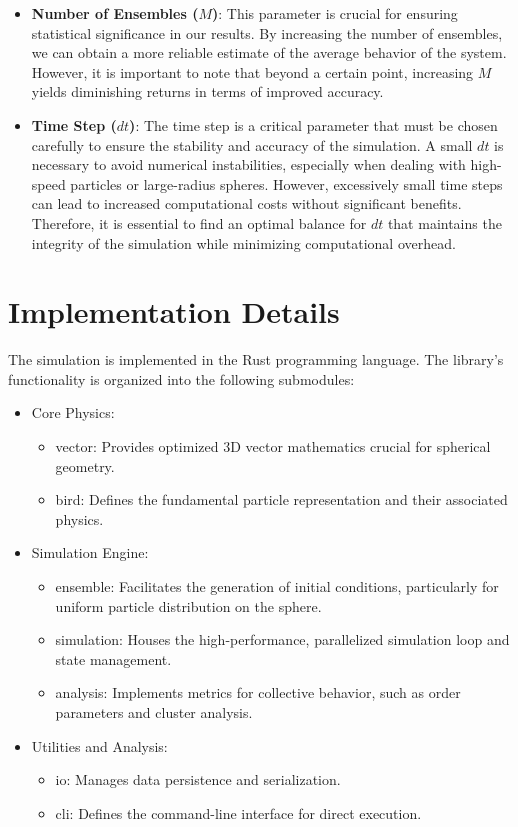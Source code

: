 \documentclass[12pt,a4paper]{article}
\begin{document}
\begin{itemize}
    \item \textbf{Number of Ensembles ($M$)}: 
    This parameter is crucial for ensuring statistical significance in our results. By increasing the number of ensembles, we can obtain a more reliable estimate of the average behavior of the system. However, it is important to note that beyond a certain point, increasing \(M\) yields diminishing returns in terms of improved accuracy.
    \item \textbf{Time Step ($dt$)}: 
    The time step is a critical parameter that must be chosen carefully to ensure the stability and accuracy of the simulation. A small \(dt\) is necessary to avoid numerical instabilities, especially when dealing with high-speed particles or large-radius spheres. However, excessively small time steps can lead to increased computational costs without significant benefits. Therefore, it is essential to find an optimal balance for \(dt\) that maintains the integrity of the simulation while minimizing computational overhead.
\end{itemize}

\section{Implementation Details}
The simulation is implemented in the Rust programming language. The library's functionality is organized into the following submodules:
\begin{itemize}
    \item Core Physics: \begin{itemize}
        \item vector: Provides optimized 3D vector mathematics crucial for spherical geometry.
        \item bird: Defines the fundamental particle representation and their associated physics.
    \end{itemize}
    \item Simulation Engine: \begin{itemize}
        \item ensemble: Facilitates the generation of initial conditions, particularly for uniform particle distribution on the sphere.
        \item simulation: Houses the high-performance, parallelized simulation loop and state management.
        \item analysis: Implements metrics for collective behavior, such as order parameters and cluster analysis.
    \end{itemize}
    \item Utilities and Analysis: \begin{itemize}
        \item io: Manages data persistence and serialization.
        \item cli: Defines the command-line interface for direct execution.
    \end{itemize}
\end{itemize}
\end{document}
